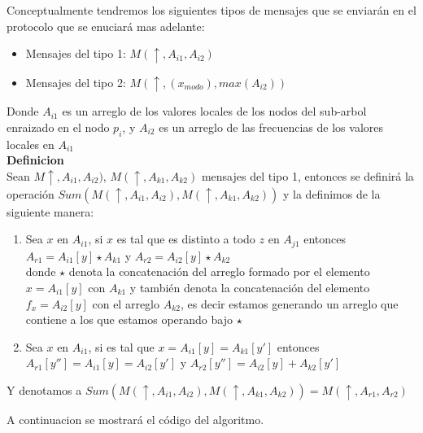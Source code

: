 \documentclass[11pt]{article}
\begin{document}
\begin{definition}
    Conceptualmente tendremos los siguientes tipos de mensajes que se enviarán en el protocolo que se enuciará mas adelante:
    \begin{itemize}
        \item Mensajes del tipo 1: $M(\uparrow, A_{i1},A_{i2}) $
        \item Mensajes del tipo 2: $ M(\uparrow,(x_{modo}), max(A_{i2}))$
    \end{itemize}
\end{definition}


Donde $A_{i1}$ es un arreglo de los valores locales de los nodos del sub-arbol enraizado
en el nodo $p_{i}$, y $A_{i2}$ es un arreglo de las frecuencias de los valores locales en $A_{i1}$
\\

\textbf{Definicion}\\
Sean $M\uparrow, A_{i1}, A_{i2})$, $M(\uparrow, A_{k1}, A_{k2})$ mensajes del tipo 1, entonces se definirá la operación $Sum(M(\uparrow, A_{i1}, A_{i2}), M(\uparrow, A_{k1}, A_{k2}))$ y la definimos
de la siguiente manera:\\
\begin{enumerate}
    \item Sea $x$ en $A_{i1}$, si $x$ es tal que es distinto a todo $z$ en $A_{j1}$
     entonces \\ $A_{r1} = A_{i1}[y] \star A_{k1}$ y $A_{r2} = A_{i2}[y] \star A_{k2}$ \\
     donde $\star$ denota la concatenación del arreglo formado por el elemento  $x = A_{i1}[y]$ con $A_{k1}$ y también denota
     la concatenación del elemento $f_{x} = A_{i2}[y]$ con el arreglo $A_{k2}$, es decir estamos generando un arreglo
     que contiene a los que estamos operando bajo $\star$
    \item Sea $x$ en $A_{i1}$, si es tal que $x = A_{i1}[y] = A_{k1}[y']$ entonces $A_{r1}[y''] = A_{i1}[y] = A_{i2}[y']$  y
    $A_{r2}[y''] = A_{i2}[y] + A_{k2}[y']$
\end{enumerate}

Y denotamos a $Sum(M(\uparrow,A_{i1}, A_{i2}), M(\uparrow, A_{k1}, A_{k2})) = M(\uparrow, A_{r1}, A_{r2})$

\newpage

A continuacion se mostrará el código del algoritmo.
\end{document}
